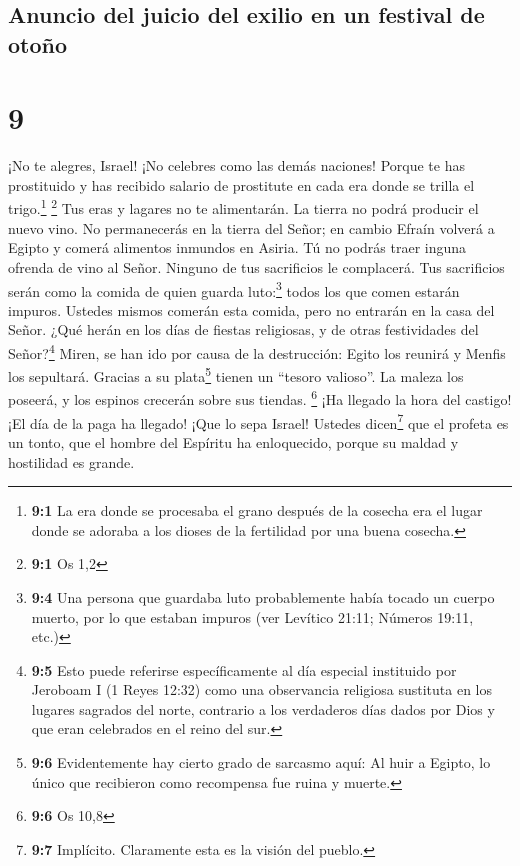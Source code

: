 \hypertarget{anuncio-del-juicio-del-exilio-en-un-festival-de-otouxf1o}{%
\subsection{Anuncio del juicio del exilio en un festival de
otoño}\label{anuncio-del-juicio-del-exilio-en-un-festival-de-otouxf1o}}

\hypertarget{section-8}{%
\section{9}\label{section-8}}

 ¡No te alegres, Israel! ¡No celebres como las demás
naciones! Porque te has prostituido y has recibido salario de prostitute
en cada era donde se trilla el trigo.\footnote{\textbf{9:1} La era donde
  se procesaba el grano después de la cosecha era el lugar donde se
  adoraba a los dioses de la fertilidad por una buena cosecha.}
\footnote{\textbf{9:1} Os 1,2}  Tus eras y lagares no te
alimentarán. La tierra no podrá producir el nuevo vino. 
No permanecerás en la tierra del Señor; en cambio Efraín volverá a
Egipto y comerá alimentos inmundos en Asiria.  Tú no
podrás traer inguna ofrenda de vino al Señor. Ninguno de tus sacrificios
le complacerá. Tus sacrificios serán como la comida de quien guarda
luto:\footnote{\textbf{9:4} Una persona que guardaba luto probablemente
  había tocado un cuerpo muerto, por lo que estaban impuros (ver
  Levítico 21:11; Números 19:11, etc.)} todos los que comen estarán
impuros. Ustedes mismos comerán esta comida, pero no entrarán en la casa
del Señor.  ¿Qué herán en los días de fiestas religiosas,
y de otras festividades del Señor?\footnote{\textbf{9:5} Esto puede
  referirse específicamente al día especial instituido por Jeroboam I (1
  Reyes 12:32) como una observancia religiosa sustituta en los lugares
  sagrados del norte, contrario a los verdaderos días dados por Dios y
  que eran celebrados en el reino del sur.}  Miren, se han
ido por causa de la destrucción: Egito los reunirá y Menfis los
sepultará. Gracias a su plata\footnote{\textbf{9:6} Evidentemente hay
  cierto grado de sarcasmo aquí: Al huir a Egipto, lo único que
  recibieron como recompensa fue ruina y muerte.} tienen un ``tesoro
valioso''. La maleza los poseerá, y los espinos crecerán sobre sus
tiendas. \footnote{\textbf{9:6} Os 10,8}  ¡Ha llegado la
hora del castigo! ¡El día de la paga ha llegado! ¡Que lo sepa Israel!
Ustedes dicen\footnote{\textbf{9:7} Implícito. Claramente esta es la
  visión del pueblo.} que el profeta es un tonto, que el hombre del
Espíritu ha enloquecido, porque su maldad y hostilidad es grande.

